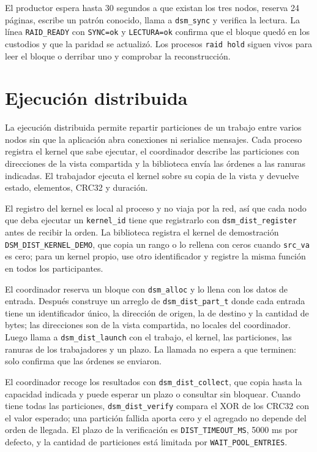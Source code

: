 El productor espera hasta 30 segundos a que existan los tres nodos, reserva 24 páginas, escribe un patrón conocido, llama a \texttt{dsm\_sync} y verifica la lectura. La línea \texttt{RAID\_READY} con \texttt{SYNC=ok} y \texttt{LECTURA=ok} confirma que el bloque quedó en los custodios y que la paridad se actualizó. Los procesos \texttt{raid hold} siguen vivos para leer el bloque o derribar uno y comprobar la reconstrucción.

\section{Ejecución distribuida}\label{sec:ejecucion-distribuida}

La ejecución distribuida permite repartir particiones de un trabajo entre varios nodos sin que la aplicación abra conexiones ni serialice mensajes. Cada proceso registra el kernel que sabe ejecutar, el coordinador describe las particiones con direcciones de la vista compartida y la biblioteca envía las órdenes a las ranuras indicadas. El trabajador ejecuta el kernel sobre su copia de la vista y devuelve estado, elementos, CRC32 y duración.

El registro del kernel es local al proceso y no viaja por la red, así que cada nodo que deba ejecutar un \texttt{kernel\_id} tiene que registrarlo con \texttt{dsm\_dist\_register} antes de recibir la orden. La biblioteca registra el kernel de demostración \texttt{DSM\_DIST\_KERNEL\_DEMO}, que copia un rango o lo rellena con ceros cuando \texttt{src\_va} es cero; para un kernel propio, use otro identificador y registre la misma función en todos los participantes.

El coordinador reserva un bloque con \texttt{dsm\_alloc} y lo llena con los datos de entrada. Después construye un arreglo de \texttt{dsm\_dist\_part\_t} donde cada entrada tiene un identificador único, la dirección de origen, la de destino y la cantidad de bytes; las direcciones son de la vista compartida, no locales del coordinador. Luego llama a \texttt{dsm\_dist\_launch} con el trabajo, el kernel, las particiones, las ranuras de los trabajadores y un plazo. La llamada no espera a que terminen: solo confirma que las órdenes se enviaron.

El coordinador recoge los resultados con \texttt{dsm\_dist\_collect}, que copia hasta la capacidad indicada y puede esperar un plazo o consultar sin bloquear. Cuando tiene todas las particiones, \texttt{dsm\_dist\_verify} compara el XOR de los CRC32 con el valor esperado; una partición fallida aporta cero y el agregado no depende del orden de llegada. El plazo de la verificación es \texttt{DIST\_TIMEOUT\_MS}, 5000 ms por defecto, y la cantidad de particiones está limitada por \texttt{WAIT\_POOL\_ENTRIES}.

